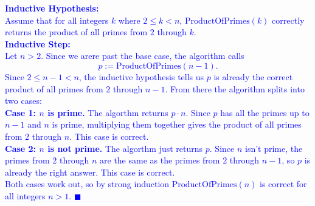 \documentclass{article}
\begin{document}
\textcolor{blue}{\textbf{Inductive Hypothesis:}} \\[0.3em]
\textcolor{blue}{
Assume that for all integers $k$ where $2 \leq k < n$, $\text{ProductOfPrimes}(k)$ correctly returns the product of all primes from $2$ through $k$.
} \\[0.5em]

\textcolor{blue}{\textbf{Inductive Step:}} \\[0.3em]
\textcolor{blue}{
Let $n > 2$. Since we arere past the base case, the algorithm calls
\[
p := \text{ProductOfPrimes}(n - 1).
\]
Since $2 \leq n-1 < n$, the inductive hypothesis tells us $p$ is already the correct product of all primes from $2$ through $n-1$. From there the algorithm splits into two cases:
} \\[0.3em]

\textcolor{blue}{
\textbf{Case 1: $n$ is prime.} The algorthm returns $p \cdot n$. Since $p$ has all the primes up to $n-1$ and $n$ is prime, multiplying them together gives the product of all primes from $2$ through $n$. This case is correct.
} \\[0.3em]

\textcolor{blue}{
\textbf{Case 2: $n$ is not prime.} The algorthm just returns $p$. Since $n$ isn't prime, the primes from $2$ through $n$ are the same as the primes from $2$ through $n-1$, so $p$ is already the right answer. This case is correct.
} \\[0.5em]

\textcolor{blue}{
Both cases work out, so by strong induction $\text{ProductOfPrimes}(n)$ is correct for all integers $n > 1$. $\blacksquare$
}
\end{document}

